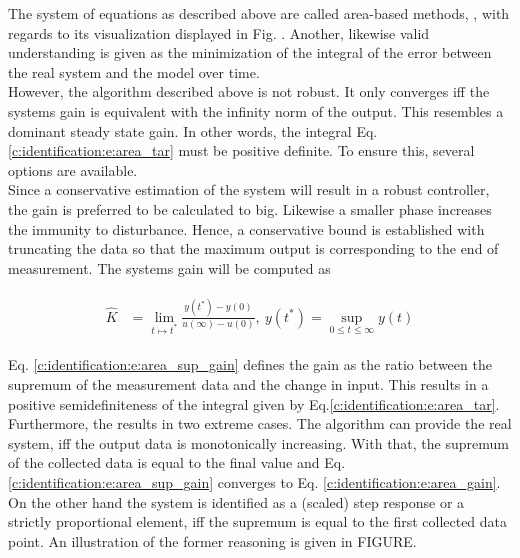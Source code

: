 The system of equations as described above are called area-based methods, \cite{Fedele2009a}, with regards to its visualization displayed in Fig. . Another, likewise valid understanding is given as the minimization of the integral of the error between the real system and the model over time.\\

%  

However, the algorithm described above is not robust. It only converges iff the systems gain is equivalent with the infinity norm of the output. This resembles a dominant steady state gain. In other words, the integral Eq. \ref{c:identification:e:area_tar} must be positive definite. To ensure this, several options are available. \\

Since a conservative estimation of the system will result in a robust controller, the gain is preferred to be calculated to big. Likewise a smaller phase increases the immunity to disturbance. Hence, a conservative bound is established with truncating the data so that the maximum output is corresponding to the end of measurement. The systems gain will be computed as

\begin{align}
\begin{split}
\hat{K} &= \lim_{t\mapsto t^*} \frac{y(t^*)-y(0)}{u(\infty)-u(0)}, ~ y(t^*) = \sup_{0 \leq t \leq \infty} y(t)
\end{split}
\label{c:identification:e:area_sup_gain}
\end{align}

Eq. \ref{c:identification:e:area_sup_gain} defines the gain as the ratio between the supremum of the measurement data and the change in input. This results in a positive semidefiniteness of the integral given by Eq.\ref{c:identification:e:area_tar}. Furthermore, the results in two extreme cases. The algorithm can provide the real system, iff the output data is monotonically increasing. With that, the supremum of the collected data is equal to the final value and Eq.\ref{c:identification:e:area_sup_gain} converges to Eq. \ref{c:identification:e:area_gain}. On the other hand the system is identified as a (scaled) step response or a strictly proportional element, iff the supremum is equal to the first collected data point. An illustration of the former reasoning is given in FIGURE.\\

